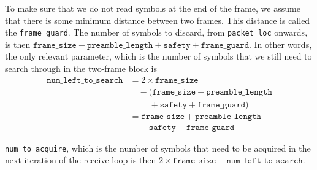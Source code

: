 To make sure that we do not read symbols at the end of the frame, we assume
that there is some minimum distance between two frames. This distance is called
the \verb+frame_guard+. The number of symbols to discard, from
\verb+packet_loc+ onwards, is then $\texttt{frame\_size}
- \texttt{preamble\_length} + \texttt{safety} + \texttt{frame\_guard}$. In
other words, the only relevant parameter, which is the number of symbols that
we still need to search through in the two-frame block is
\begin{equation}
	\begin{split}
		\texttt{num\_left\_to\_search} &= 2 \times \texttt{frame\_size} \\
		                               & \quad - (\texttt{frame\_size} - \texttt{preamble\_length} \\
		                               & \quad \quad \; + \texttt{safety} + \texttt{frame\_guard}) \\
		                               &= \texttt{frame\_size} + \texttt{preamble\_length} \\
		                               & \quad - \texttt{safety} - \texttt{frame\_guard}
	\end{split}
\end{equation}

\verb+num_to_acquire+, which is the number of symbols that need to be acquired
in the next iteration of the receive loop is then
$2 \times \texttt{frame\_size} - \texttt{num\_left\_to\_search}$.
